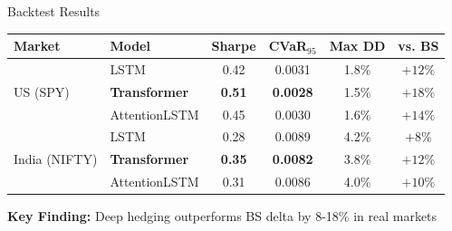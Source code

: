 \documentclass[aspectratio=169,11pt]{beamer}
\begin{document}
\begin{frame}{Backtest Results}
\begin{table}
\centering
\begin{tabular}{llcccc}
\toprule
\textbf{Market} & \textbf{Model} & \textbf{Sharpe} & \textbf{CVaR$_{95}$} & \textbf{Max DD} & \textbf{vs. BS} \\
\midrule
\multirow{3}{*}{US (SPY)} 
& LSTM & 0.42 & 0.0031 & 1.8\% & $+12\%$ \\
& \textbf{Transformer} & \textbf{0.51} & \textbf{0.0028} & 1.5\% & $+18\%$ \\
& AttentionLSTM & 0.45 & 0.0030 & 1.6\% & $+14\%$ \\
\midrule
\multirow{3}{*}{India (NIFTY)} 
& LSTM & 0.28 & 0.0089 & 4.2\% & $+8\%$ \\
& \textbf{Transformer} & \textbf{0.35} & \textbf{0.0082} & 3.8\% & $+12\%$ \\
& AttentionLSTM & 0.31 & 0.0086 & 4.0\% & $+10\%$ \\
\bottomrule
\end{tabular}
\end{table}

\vspace{0.3cm}
\textbf{Key Finding:} Deep hedging outperforms BS delta by 8-18\% in real markets
\end{frame}
\end{document}
